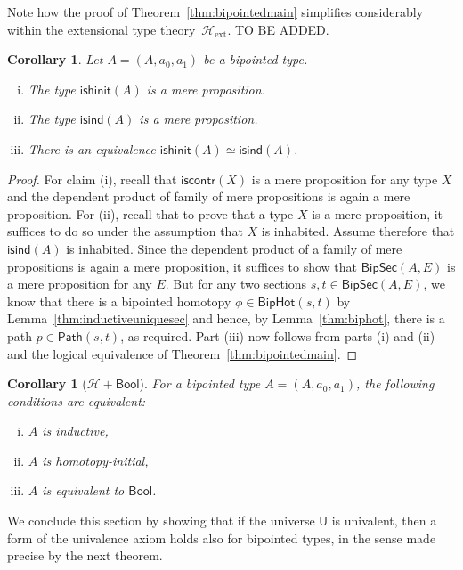 \documentclass[10pt,a4paper,oneside,reqno]{amsart}
\numberwithin{equation}{section}
\theoremstyle{mythm}
\newtheorem{corollary}[theorem]{Corollary}
\theoremstyle{mydef}
\theoremstyle{myrmk}
\newcommand{\Hint}{\mathcal{H}}
\newcommand{\Hext}{\mathcal{H}_{\mathrm{ext}}}
\newcommand{\iscontr}{\mathsf{iscontr}}
\newcommand{\Id}{\mathsf{Path}}
\newcommand{\Bool}{\mathsf{Bool}}
\newcommand{\UU}{\mathsf{U}}
\newcommand{\BipSec}{\mathsf{BipSec}}
\newcommand{\ishinit}{\mathsf{ishinit}}
\newcommand{\isind}{\mathsf{isind}}
\newcommand{\BipHot}{\mathsf{BipHot}}
\begin{document}
Note how the proof of Theorem~\ref{thm:bipointedmain} simplifies considerably within the extensional
type theory~$\Hext$. TO BE ADDED.


\begin{corollary}  Let $A = (A, a_0, a_1)$ be a bipointed type.
\begin{enumerate}[(i)]
\item The type $\ishinit(A)$ is a mere proposition.
\item The type $\isind(A)$ is a mere proposition.
\item There is an equivalence $\ishinit(A) \simeq \isind(A)$.
\end{enumerate}
\end{corollary}

\begin{proof} For claim (i), recall that  $\iscontr(X)$ is a mere proposition for any type $X$ and the dependent product of family of mere propositions is again a mere proposition. For (ii), recall that to prove that a type $X$ is a mere proposition, it suffices to do so under the assumption that $X$ is inhabited. Assume therefore that $\isind(A)$ is inhabited. Since the dependent product of a family of mere propositions is again a mere proposition, it suffices to show that $\BipSec(A,E)$ is a mere proposition for any $E$. But for any two sections $s, t \in \BipSec(A,E)$, we know that there is a 
bipointed homotopy $\phi \in \BipHot(s,t)$ by Lemma~\ref{thm:inductiveuniquesec} and hence, by 
Lemma~\ref{thm:biphot}, there is a path $p \in \Id(s,t)$, as required. Part (iii) now follows from parts (i) and (ii) and  the logical equivalence of  Theorem~\ref{thm:bipointedmain}. 
\end{proof}



\begin{corollary}[$\Hint + \Bool$]  For a bipointed type $A = (A, a_0, a_1)$, the following 
conditions are equivalent:
\begin{enumerate}[(i)]
\item $A$ is inductive,
\item $A$ is homotopy-initial,
\item $A$ is equivalent to $\Bool$.
\end{enumerate}
\end{corollary}

We conclude this section by showing that if the universe $\UU$ is univalent, then a form of the univalence axiom holds also for bipointed types, in the sense made precise by the next theorem.
\end{document}
